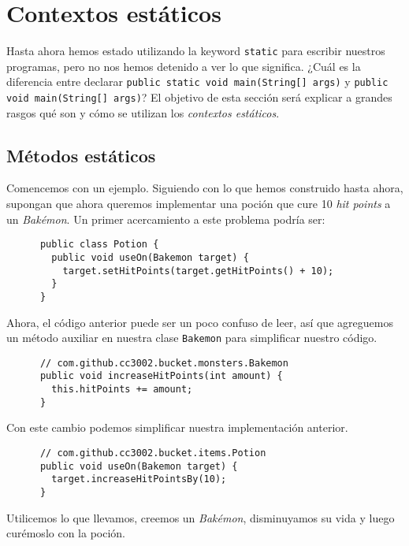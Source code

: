 \section{Contextos estáticos}
  Hasta ahora hemos estado utilizando la keyword \texttt{static} para escribir nuestros
  programas, pero no nos hemos detenido a ver lo que significa.
  ¿Cuál es la diferencia entre declarar \texttt{public static void main(String[] args)} y
  \texttt{public void main(String[] args)}?
  El objetivo de esta sección será explicar a grandes rasgos qué son y cómo se utilizan los 
  \textit{contextos estáticos}.

  \subsection{Métodos estáticos}
    Comencemos con un ejemplo. 
    Siguiendo con lo que hemos construido hasta ahora, supongan que ahora queremos implementar una 
    poción que cure 10 \textit{hit points} a un \textit{Bakémon}.
    Un primer acercamiento a este problema podría ser:

    \begin{verbatim}
      public class Potion {
        public void useOn(Bakemon target) {
          target.setHitPoints(target.getHitPoints() + 10);
        }
      }
    \end{verbatim}

    Ahora, el código anterior puede ser un poco confuso de leer, así que agreguemos un método auxiliar
    en nuestra clase \texttt{Bakemon} para simplificar nuestro código.

    \begin{verbatim}
      // com.github.cc3002.bucket.monsters.Bakemon
      public void increaseHitPoints(int amount) {
        this.hitPoints += amount;
      }
    \end{verbatim}

    Con este cambio podemos simplificar nuestra implementación anterior.

    \begin{verbatim}
      // com.github.cc3002.bucket.items.Potion
      public void useOn(Bakemon target) {
        target.increaseHitPointsBy(10);
      }
    \end{verbatim}

    Utilicemos lo que llevamos, creemos un \textit{Bakémon}, disminuyamos su vida y luego curémoslo
    con la poción.

